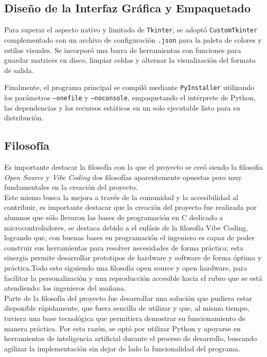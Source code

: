 \documentclass[12pt,a4paper]{article}
\begin{document}
\subsection{Diseño de la Interfaz Gráfica y Empaquetado}
Para superar el aspecto nativo y limitado de \texttt{Tkinter}, se adoptó \texttt{CustomTkinter} complementado con un archivo de configuración \texttt{.json} para la paleta de colores y estilos visuales. Se incorporó una barra de herramientas con funciones para guardar matrices en disco, limpiar celdas y alternar la visualización del formato de salida.

Finalmente, el programa principal se compiló mediante \texttt{PyInstaller} utilizando los parámetros \texttt{--onefile} y \texttt{--noconsole}, empaquetando el intérprete de Python, las dependencias y los recursos estáticos en un solo ejecutable listo para su distribución.

\subsection{Filosofía}
Es importante destacar la filosofía con la que el proyecto se creó siendo la filosofia \textit{Open Source} y \textit{Vibe Coding} dos filosofías aparentemente opuestas pero muy fundamentales en la creación del proyecto. \\


Este mismo busca la mejora a través de la comunidad y la accesibilidad al contribuir, es importante destacar que la creación
del proyecto fue realizada por alumnos que sólo llevaron las bases de programación en C dedicado a microcontroladores, se destaca debido a el enfásis de la filosofía Vibe Coding, logrando que, con buenas bases en programación el ingeniero es capaz de poder construir sus herramientas para resolver necesidades de forma práctica; esta sinergia permite desarrollar prototipos de hardware y software de forma óptima y práctica.Todo esto siguiendo una filosofía open source y open hardware, para facilitar la personalización y una reproducción accesible hacia el rubro que se está atendiendo: los ingenieros del mañana.  \\

Parte de la filosofía del proyecto fue desarrollar una solución que pudiera estar disponible rápidamente, que fuera sencilla de utilizar y que, al mismo tiempo, tuviera una base tecnológica que permitiera demostrar su funcionamiento de manera práctica. Por esta razón, se optó por utilizar Python y apoyarse en herramientas de inteligencia artificial durante el proceso de desarrollo, buscando agilizar la implementación sin dejar de lado la funcionalidad del programa. \\
\end{document}
